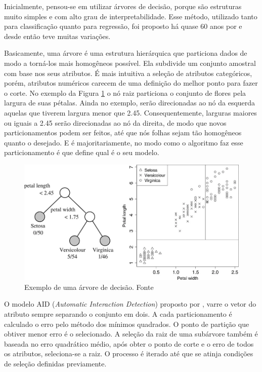 \documentclass{article}
\begin{document}
Inicialmente, pensou-se em utilizar árvores de decisão, porque são estruturas muito simples e com alto grau de interpretabilidade. Esse método, utilizado tanto para classificação quanto para regressão, foi proposto há quase 60 anos por \cite{Morgan_1963} e desde então teve muitas variações.

Basicamente, uma árvore é uma estrutura hierárquica que particiona dados de modo a torná-los mais homogêneos possível. Ela subdivide um conjunto amostral com base nos seus atributos. É mais intuitiva a seleção de atributos categóricos, porém, atributos numéricos carecem de uma definição do melhor ponto para fazer o corte. No exemplo da Figura \ref{Fig1} o nó raiz particiona o conjunto de flores pela largura de suas pétalas. Ainda no exemplo, serão direcionadas ao nó da esquerda aquelas que tiverem largura menor que 2.45. Consequentemente, larguras maiores ou iguais a 2.45 serão direcionadas ao nó da direita, de modo que novos particionamentos podem ser feitos, até que nós folhas sejam tão homogêneos quanto o desejado. E é majoritariamente, no modo como o algoritmo faz esse particionamento é que define qual é o seu modelo.

\begin{figure}[ht]
\centering
\includegraphics[width=.8\textwidth]{fig1.png}
\caption{Exemplo de uma árvore de decisão. Fonte \cite{Loh_2014}}
\label{Fig1}
\end{figure}

O modelo AID (\emph{Automatic Interaction Detection}) proposto por \cite{Morgan_1963}, varre o vetor do atributo sempre separando o conjunto em dois. A cada particionamento é calculado o erro pelo método dos mínimos quadrados. O ponto de partição que obtiver menor erro é o selecionado. A seleção da raiz de uma subárvore também é baseada no erro quadrático médio, após obter o ponto de corte e o erro de todos os atributos, seleciona-se a raiz. O processo é iterado até que se atinja condições de seleção definidas previamente.
\end{document}

